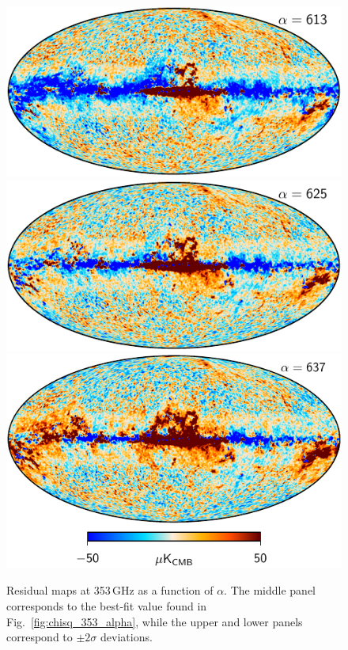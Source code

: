 \documentclass{aa}
\begin{document}
\begin{figure}
  \centering
  \includegraphics[width=\columnwidth]{figures/res_353-1_alpha097.pdf}\\
  \includegraphics[width=\columnwidth]{figures/res_353-1_alpha099.pdf}\\
  \includegraphics[width=\columnwidth]{figures/res_353-1_alpha101.pdf}
  \caption{Residual maps at 353\,GHz as a function of $\alpha$. The middle panel corresponds to the best-fit value found in Fig.~\ref{fig:chisq_353_alpha}, while the upper and lower panels correspond to $\pm2\sigma$ deviations.}
  \label{fig:res_353_alpha}
\end{figure}
\end{document}
